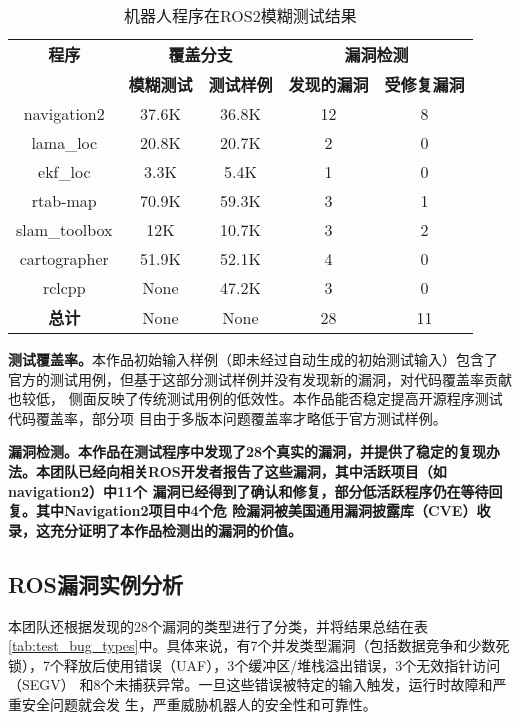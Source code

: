 \begin{table}[H]
	\small
	\caption{机器人程序在ROS2模糊测试结果}
  \label{tab:test_result}
	\centering
	\begin{tabular}{ccccc}
		\hline
		\textbf{程序} & \multicolumn{2}{c}{\textbf{覆盖分支}} & \multicolumn{2}{c}{\textbf{漏洞检测}} \\
		\cline{2-5}
		& \textbf{模糊测试} & \textbf{测试样例} & \textbf{发现的漏洞} & \textbf{受修复漏洞} \\
		\hline
		navigation2 & 37.6K & 36.8K & 12 & 8 \\
		lama\_loc & 20.8K & 20.7K & 2 & 0 \\
		ekf\_loc & 3.3K & 5.4K & 1 & 0 \\
		rtab-map & 70.9K & 59.3K & 3 & 1 \\
		slam\_toolbox & 12K & 10.7K & 3 & 2 \\
		cartographer & 51.9K & 52.1K & 4 & 0  \\
    rclcpp & None & 47.2K & 3 & 0 \\
		\textbf{总计} & None & None & 28 & 11 \\
		\hline
	\end{tabular}
\end{table}

\textbf{测试覆盖率。}本作品初始输入样例（即未经过自动生成的初始测试输入）包含了
官方的测试用例，但基于这部分测试样例并没有发现新的漏洞，对代码覆盖率贡献也较低，
侧面反映了传统测试用例的低效性。本作品能否稳定提高开源程序测试代码覆盖率，部分项
目由于多版本问题覆盖率才略低于官方测试样例。

\textbf{漏洞检测。本作品在测试程序中发现了28个真实的漏洞，并提供了稳定的复现办
法。本团队已经向相关ROS开发者报告了这些漏洞，其中活跃项目（如navigation2）中11个
漏洞已经得到了确认和修复，部分低活跃程序仍在等待回复。其中Navigation2项目中4个危
险漏洞被美国通用漏洞披露库（CVE）收录，这充分证明了本作品检测出的漏洞的价值。}

\subsection{ROS漏洞实例分析}


本团队还根据发现的28个漏洞的类型进行了分类，并将结果总结在表
\ref{tab:test_bug_types}中。具体来说，有7个并发类型漏洞（包括数据竞争和少数死
锁），7个释放后使用错误（UAF），3个缓冲区/堆栈溢出错误，3个无效指针访问（SEGV）
和8个未捕获异常。一旦这些错误被特定的输入触发，运行时故障和严重安全问题就会发
生，严重威胁机器人的安全性和可靠性。

